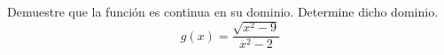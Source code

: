 \item Demuestre que la función es continua en su dominio. Determine dicho dominio.
$$g(x) = \frac{\sqrt{x^2-9}}{x^2-2}$$
